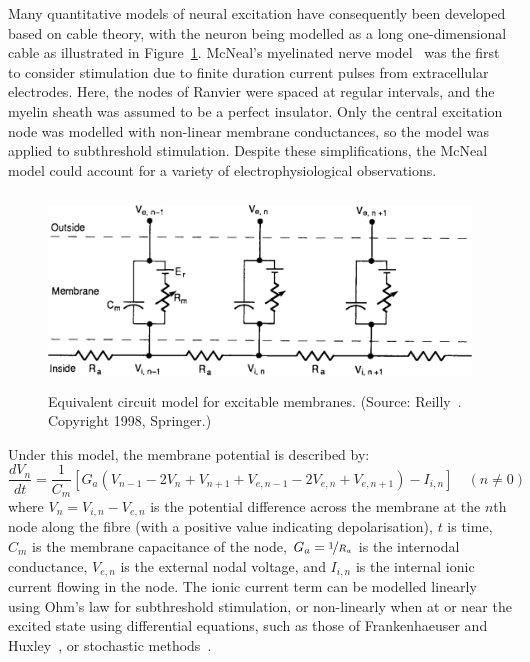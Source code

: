 Many quantitative models of neural excitation have consequently been developed
based on cable theory, with the neuron being modelled as a long one-dimensional
cable as illustrated in Figure~\ref{fig:membrane_circuit}. McNeal's myelinated
nerve model~\cite{mcneal1976} was the first to consider stimulation due to
finite duration current pulses from extracellular electrodes. Here, the nodes of
Ranvier were spaced at regular intervals, and the myelin sheath was assumed to
be a perfect insulator. Only the central excitation node was modelled with
non-linear membrane conductances, so the model was applied to subthreshold
stimulation. Despite these simplifications, the McNeal model could account for a
variety of electrophysiological observations.

\begin{figure}
	\centering
	\includegraphics[height=5.1cm]{Background/mcneal_circuit}
	\caption[Equivalent circuit model for excitable membranes]{Equivalent circuit
	model for excitable membranes. (Source: Reilly~\cite{reilly1998}. Copyright
	\textcopyright{} 1998, Springer.)}
	\label{fig:membrane_circuit}
\end{figure}

Under this model, the membrane potential is described by:
\begin{equation}
	\frac{dV_n}{dt} = \frac{1}{C_m}[G_a(V_{n-1}-2V_n+V_{n+1}
	+V_{e,n-1}-2V_{e,n}+V_{e,n+1}) - I_{i,n}] \hspace{1em} (n \neq 0)
	\label{eqn:mcneal_membrane_potential}
\end{equation}
where $ V_n = V_{i,n} - V_{e,n} $ is the potential difference across the
membrane at the $ n $th node along the fibre (with a positive value indicating
depolarisation), $ t $ is time, $ C_m $ is the membrane capacitance of the node,
$ G_a = \nicefrac{1}{R_a} $ is the internodal conductance, $ V_{e,n} $ is the
external nodal voltage, and $ I_{i,n} $ is the internal ionic current flowing in
the node. The ionic current term can be modelled linearly using Ohm's law for
subthreshold stimulation, or non-linearly when at or near the excited state
using differential equations, such as those of Frankenhaeuser and
Huxley~\cite{frankenhaeuser1964}, or stochastic methods~\cite{bruce1999}.

